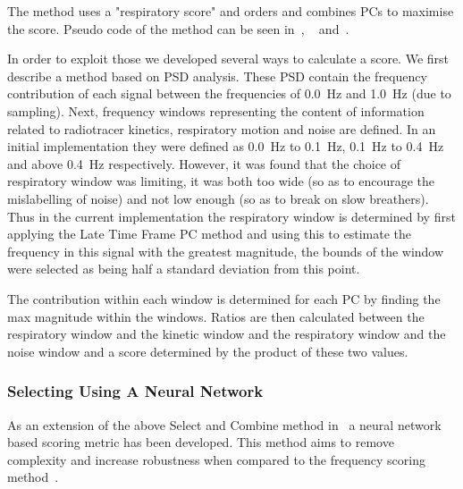             The method uses a "respiratory score"  and orders and combines PCs  to maximise the score. Pseudo code of the  method can be seen in~, ~ and~.
            
            In order to exploit those  we developed several ways to calculate a score. We first describe a method based on \gls{PSD} analysis. These \gls{PSD} contain the frequency contribution of each signal between the frequencies of \SI{0.0}{\hertz} and \SI{1.0}{\hertz} (due to sampling). Next, frequency windows representing the content of information related to radiotracer kinetics, respiratory motion and noise are defined. In an initial implementation they were defined as \SI{0.0}{\hertz} to \SI{0.1}{\hertz}, \SI{0.1}{\hertz} to \SI{0.4}{\hertz} and above \SI{0.4}{\hertz} respectively. However, it was found that the choice of respiratory window was limiting, it was both too wide (so as to encourage the mislabelling of noise) and not low enough (so as to break on slow breathers). Thus in the current implementation the respiratory window is determined by first applying the Late Time Frame \gls{PC} method and using this to estimate the frequency in this signal with the greatest magnitude, the bounds of the window were selected as being half a standard deviation from this point.
        
            The contribution within each window is determined for each \gls{PC} by finding the max magnitude within the windows. Ratios are then calculated between the respiratory window and the kinetic window and the respiratory window and the noise window and a score determined by the product of these two values.
        
        
        \subsubsection{Selecting  Using A Neural Network} \label{sec:selecting_pcs_using_a_neural_network}
            As an extension of the above Select and Combine method in~ a neural network based scoring metric has been developed. This method aims to remove complexity and increase robustness when compared to the frequency scoring method~\cite{Walker2020AutomaticAI}. %
            
